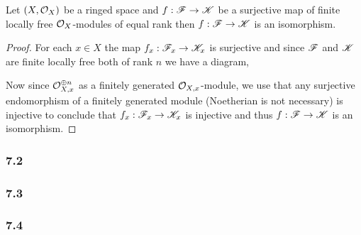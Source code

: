 \documentclass[12pt]{article}
\begin{document}
\begin{theorem}
Let $(X, \mathcal{O}_{X})$ be a ringed space and $f : \mathscr{F} \to \mathscr{K}$ be a surjective map of finite locally free $\mathcal{O}_{X}$-modules of equal rank then $f : \mathscr{F} \to \mathscr{K}$ is an isomorphism. 
\end{theorem}

\begin{proof}
For each $x \in X$ the map $f_x : \mathscr{F}_x \to \mathscr{K}_x$ is surjective and since $\mathscr{F}$ and $\mathscr{K}$ are finite locally free both of rank $n$ we have a diagram,
\begin{center}
\end{center}
Now since $\mathcal{O}_{X, x}^{\oplus n}$ as a finitely generated $\mathcal{O}_{X, x}$-module,  we use that any surjective endomorphism of a finitely generated module (Noetherian is not necessary) is injective to conclude that $f_x : \mathscr{F}_x \to \mathscr{K}_x$ is injective and thus $f : \mathscr{F} \to \mathscr{K}$ is an isomorphism. 
\end{proof}

\subsubsection{7.2}

\subsubsection{7.3}

\subsubsection{7.4}
\end{document}
